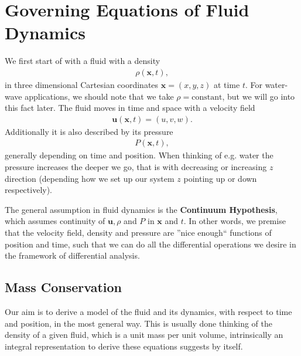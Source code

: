 \section{Governing Equations of Fluid Dynamics}
We first start of with a fluid with a density
\begin{align}
    \rho(\mathbf{x}, t),
\end{align}
in three dimensional Cartesian coordinates $\mathbf{x} = (x, y, z)$ at time
$t$. For water-wave applications, we should note that we take
$\rho=\text{constant}$, but we will go into this fact later. The fluid moves
in time and space with a velocity field
\begin{align}
    \mathbf{u}(\mathbf{x}, t) = (u, v, w).
\end{align}
Additionally it is also described by its pressure
\begin{align}
    P(\mathbf{x}, t),
\end{align}
generally depending on time and position. When thinking of e.g. water the
pressure increases the deeper we go, that is with decreasing or increasing $z$
direction (depending how we set up our system $z$ pointing up or down
respectively).

The general assumption in fluid dynamics is the \textbf{Continuum
Hypothesis}, which assumes continuity of $\textbf{u}, \rho$ and $P$ in
$\mathbf{x}$ and $t$. In other words, we premise that the velocity field,
density and pressure are ''nice enough`` functions of position and time, such
that we can do all the differential operations we desire in the framework of
differential analysis.
\subsection{Mass Conservation}
Our aim is to derive a model of the fluid and its dynamics, with respect to
time and position, in the most general way. This is usually done thinking
of the density of a given fluid, which is a unit mass per unit volume,
intrinsically  an integral representation to derive these equations suggests
by itself.

